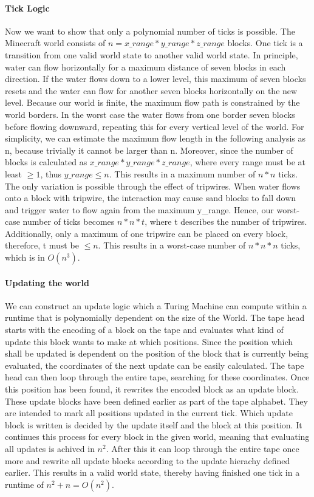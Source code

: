 	\paragraph{Tick Logic}
	Now we want to show that only a polynomial number of ticks is possible. The Minecraft world consists of $n = x\_range * y\_range * z\_range$ blocks. One tick is a transition from one valid world state to another valid world state. In principle, water can flow horizontally for a maximum distance of seven blocks in each direction. If the water flows down to a lower level, this maximum of seven blocks resets and the water can flow for another seven blocks horizontally on the new level. Because our world is finite, the maximum flow path is constrained by the world borders. In the worst case the water flows from one border seven blocks before flowing downward, repeating this for every vertical level of the world. For simplicity, we can estimate the maximum flow length in the following analysis as n, because trivially it cannot be larger than n. Moreover, since the number of blocks is calculated as $x\_range * y\_range * z\_range$, where every range must be at least $\geq 1$, thus $y\_range \leq n$. This results in a maximum number of $n * n$ ticks. The only variation is possible through the effect of tripwires. When water flows onto a block with tripwire, the interaction may cause sand blocks to fall down and trigger water to flow again from the maximum y\_range. Hence, our worst-case number of ticks becomes $n * n * t$, where t describes the number of tripwires. Additionally, only a maximum of one tripwire can be placed on every block, therefore, t must be $\leq n$. This results in a worst-case number of $n * n * n$ ticks, which is in $O(n^{3})$.
	
	
	\paragraph{Updating the world} \label{updating}
	We can construct an update logic which a Turing Machine can compute within a runtime that is polynomially dependent on the size of the World.
	The tape head starts with the encoding of a block on the tape and evaluates what kind of update this block wants to make at which positions.
	Since the position which shall be updated is dependent on the position of the block that is currently being evaluated, the coordinates of the next update can be easily calculated.
	The tape head can then loop through the entire tape, searching for these coordinates.
	Once this position has been found, it rewrites the encoded block as an update block.
	These update blocks have been defined earlier as part of the tape alphabet. They are intended to mark all positions updated in the current tick.
	Which update block is written is decided by the update itself and the block at this position.
	It continues this process for every block in the given world, meaning that evaluating all updates is achived in $n^2$.
	After this it can loop through the entire tape once more and rewrite all update blocks according to the update hierachy defined earlier.
	This results in a valid world state, thereby having finished one tick in a runtime of $n^{2} + n = O(n^{2})$.
 

